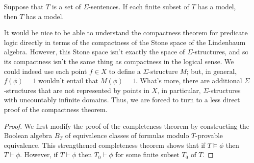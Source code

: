 
\begin{thm}[Compactness] Suppose that $T$ is a set of
  $\Sigma$-sentences.  If each finite subset of $T$ has a model, then
  $T$ has a model.  \end{thm}

It would be nice to be able to understand the compactness theorem for
predicate logic directly in terms of the compactness of the Stone
space of the Lindenbaum algebra.  However, this Stone space isn't
exactly the space of $\Sigma$-structures, and so its compactness isn't
the same thing as compactness in the logical sense.  We could indeed
use each point $f\in X$ to define a $\Sigma$-structure $M$; but, in
general, $f(\phi )=1$ wouldn't entail that $M(\phi )=1$.  What's more,
there are additional $\Sigma$-structures that are not represented by
points in $X$, in particular, $\Sigma$-structures with uncountably
infinite domains.  Thus, we are forced to turn to a less direct proof
of the compactness theorem.

\begin{proof} We first modify the proof of the completeness theorem by
  constructing the Boolean algebra $B_T$ of equivalence classes of
  formulas modulo $T$-provable equivalence.  This strengthened
  completeness theorem shows that if $T\vDash\phi$ then $T\vdash\phi$.
  However, if $T\vdash\phi$ then $T_0\vdash\phi$ for some finite
  subset $T_0$ of $T$. \end{proof}






